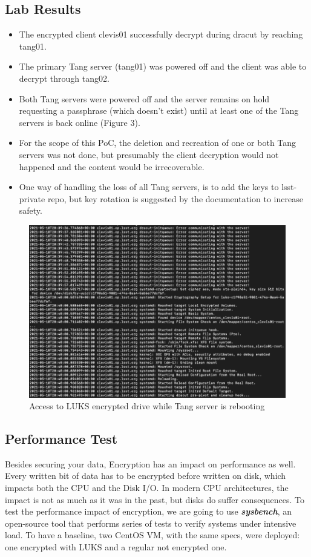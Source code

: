 \newpage
\subsection{Lab Results}
\begin{itemize}
  \item The encrypted client clevis01 successfully decrypt during dracut by reaching tang01.
  \item The primary Tang server (tang01) was powered off and the client was able to decrypt through tang02.
  \item Both Tang servers were powered off and the server remains on hold requesting a passphrase (which doesn't exist) until at least one of the Tang servers is back online (Figure 3).
  \item For the scope of this PoC, the deletion and recreation of one or both Tang servers was not done, but presumably the client decryption would not happened and the content would be irrecoverable.
  \item One way of handling the loss of all Tang servers, is to add the keys to lsst-private repo, but key rotation is suggested by the documentation to increase safety.
\end{itemize}

\begin{figure}
  \includegraphics[width=16cm]{images/image1.png}
  \centering
  \caption{Access to LUKS encrypted drive while Tang server is rebooting}
\end{figure}

\newpage
\subsection{Performance Test}
Besides securing your data, Encryption has an impact on performance as well. Every written bit of data has to be encrypted before written on disk, which impacts both the CPU and the Disk I/O. In modern CPU architectures, the impact is not as much as it was in the past, but disks do suffer consequences.
To test the performance impact of encryption, we are going to use \textbf{\textit{sysbench}}, an open-source tool that performs series of tests to verify systems under intensive load. To have a baseline, two CentOS VM, with the same specs, were deployed: one encrypted with LUKS and a regular not encrypted one.
